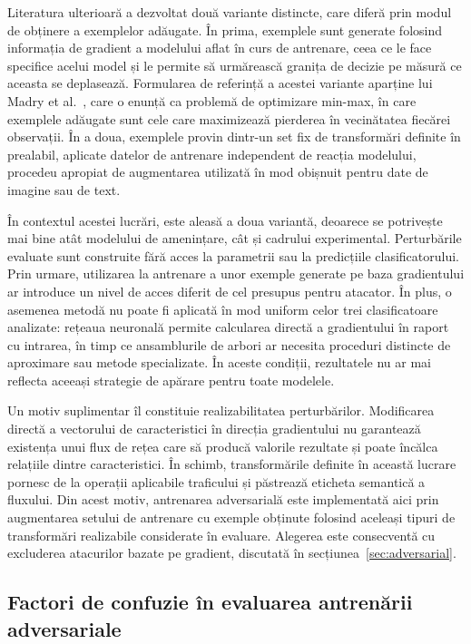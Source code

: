 Literatura ulterioară a dezvoltat două variante distincte, care diferă prin modul de obținere a exemplelor adăugate. În prima, exemplele sunt generate folosind informația de gradient a modelului aflat în curs de antrenare, ceea ce le face specifice acelui model și le permite să urmărească granița de decizie pe măsură ce aceasta se deplasează. Formularea de referință a acestei variante aparține lui Madry et al.~\cite{madry2018towards}, care o enunță ca problemă de optimizare min-max, în care exemplele adăugate sunt cele care maximizează pierderea în vecinătatea fiecărei observații. În a doua, exemplele provin dintr-un set fix de transformări definite în prealabil, aplicate datelor de antrenare independent de reacția modelului, procedeu apropiat de augmentarea utilizată în mod obișnuit pentru date de imagine sau de text.

În contextul acestei lucrări, este aleasă a doua variantă, deoarece se potrivește mai bine atât modelului de amenințare, cât și cadrului experimental. Perturbările evaluate sunt construite fără acces la parametrii sau la predicțiile clasificatorului. Prin urmare, utilizarea la antrenare a unor exemple generate pe baza gradientului ar introduce un nivel de acces diferit de cel presupus pentru atacator. În plus, o asemenea metodă nu poate fi aplicată în mod uniform celor trei clasificatoare analizate: rețeaua neuronală permite calcularea directă a gradientului în raport cu intrarea, în timp ce ansamblurile de arbori ar necesita proceduri distincte de aproximare sau metode specializate. În aceste condiții, rezultatele nu ar mai reflecta aceeași strategie de apărare pentru toate modelele.

Un motiv suplimentar îl constituie realizabilitatea perturbărilor. Modificarea directă a vectorului de caracteristici în direcția gradientului nu garantează existența unui flux de rețea care să producă valorile rezultate și poate încălca relațiile dintre caracteristici. În schimb, transformările definite în această lucrare pornesc de la operații aplicabile traficului și păstrează eticheta semantică a fluxului. Din acest motiv, antrenarea adversarială este implementată aici prin augmentarea setului de antrenare cu exemple obținute folosind aceleași tipuri de transformări realizabile considerate în evaluare. Alegerea este consecventă cu excluderea atacurilor bazate pe gradient, discutată în secțiunea~\ref{sec:adversarial}.


\subsection{Factori de confuzie în evaluarea antrenării adversariale}
\label{subsec:control-lipsa}

